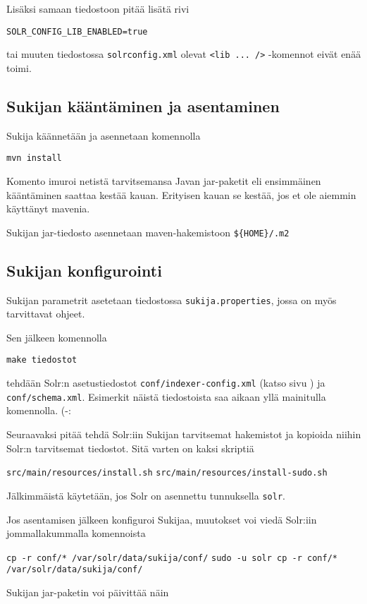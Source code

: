 \documentclass[12pt]{article}
\begin{document}
\bigskip\noindent
Lisäksi samaan tiedostoon pitää lisätä rivi

\verb|SOLR_CONFIG_LIB_ENABLED=true|

tai muuten tiedostossa \verb|solrconfig.xml| olevat
\verb|<lib ... />| -komennot eivät enää toimi.


\newpage
\subsection*{Sukijan kääntäminen ja asentaminen}

Sukija käännetään ja asennetaan komennolla

\verb=mvn install=

Komento imuroi netistä tarvitsemansa Javan jar-paketit eli ensimmäinen
kääntäminen saattaa kestää kauan. Erityisen kauan se kestää, jos et
ole aiemmin käyttänyt mavenia.

Sukijan jar-tiedosto asennetaan maven-hakemistoon \verb|${HOME}/.m2|


\subsection*{Sukijan konfigurointi}

Sukijan parametrit asetetaan tiedostossa \verb|sukija.properties|,
jossa on myös tarvittavat ohjeet.

Sen jälkeen komennolla

\verb|make tiedostot|

tehdään Solr:n asetustiedostot \verb=conf/indexer-config.xml= (katso
sivu ) ja \verb=conf/schema.xml=. Esimerkit näistä
tiedostoista saa aikaan yllä mainitulla komennolla. (-:

Seuraavaksi pitää tehdä Solr:iin Sukijan tarvitsemat hakemistot ja
kopioida niihin Solr:n tarvitsemat tiedostot. Sitä varten on kaksi
skriptiä

\verb=src/main/resources/install.sh=
\verb=src/main/resources/install-sudo.sh=

Jälkimmäistä käytetään, jos Solr on asennettu tunnuksella \verb=solr=.


\bigskip
Jos asentamisen jälkeen konfiguroi Sukijaa, muutokset voi viedä
Solr:iin jommallakummalla komennoista

\verb=cp -r conf/* /var/solr/data/sukija/conf/=
\verb=sudo -u solr cp -r conf/* /var/solr/data/sukija/conf/=

Sukijan jar-paketin voi päivittää näin
\end{document}
